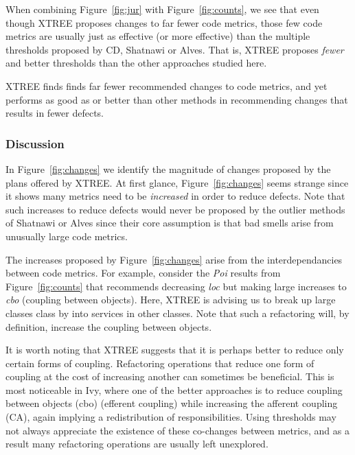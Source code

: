 \documentclass{sig-alternate}
\newcommand{\fig}[1]{Figure~\ref{fig:#1}}
\theoremstyle{break}
\begin{document}
\begin{itemize}
% 


When combining  \fig{jur} with \fig{counts}, we   see that
even though XTREE proposes changes to far fewer code metrics, those few
code metrics are usually just as effective (or
more effective) than the multiple
thresholds
proposed by CD, Shatnawi or Alves.  That is, XTREE proposes
{\em fewer} and better thresholds than the other approaches studied here.

\begin{lesson}
XTREE finds finds far fewer recommended changes to code metrics, and yet performs as good as or better than other methods in recommending changes that results in fewer defects.
\end{lesson}




\subsubsection{Discussion}\label{sect:inc}
 

In \fig{changes} we identify the magnitude of changes proposed by the plans offered by XTREE.
At first glance, \fig{changes} seems strange since it 
shows many metrics need to be {\em increased} in order
to reduce defects. Note that such increases  to reduce
defects would never be proposed by the outlier methods
of Shatnawi or Alves since their core assumption is that bad
smells arise from unusually large code metrics.

The increases proposed by 
\fig{changes} arise from the interdependancies between
code metrics. For example, consider the {\em Poi} results
from \fig{counts} that recommends decreasing {\em loc}
but making large increases to {\em cbo} (coupling between
objects). Here, XTREE is advising us to break up
large classes class by into services
in other classes. Note that such a refactoring will, by
definition, increase the coupling between objects. 

 


It is worth noting that XTREE suggests that it is perhaps better to reduce only certain forms of coupling. Refactoring operations that reduce one form of coupling at the cost of increasing another can sometimes be beneficial. This is most noticeable in Ivy, where one of the better approaches is to reduce coupling between objects (cbo) (efferent coupling) while increasing the afferent coupling (CA), again implying a redistribution of responsibilities. Using thresholds may not always appreciate the existence of these co-changes between metrics, and as a result many refactoring operations are usually left unexplored.



\end{itemize}
\end{document}
